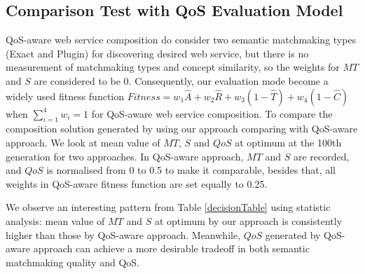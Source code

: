 \documentclass{IEEEtran}
\begin{document}
\subsection{Comparison Test with QoS Evaluation Model}\label{comparisonTest}
QoS-aware web service composition \cite{da2016particle,da2015graphevol,yu2013adaptive,ma2015hybrid} do consider two semantic matchmaking types (Exact and Plugin) for discovering desired web service, but there is no measurement of matchmaking types and concept similarity, so the weights for $MT$ and $S$ are considered to be 0. Consequently, our evaluation mode become a widely used fitness function $Fitness = w_1 \hat{A} + w_2 \hat{R} + w_3(1 - \hat{T}) + w_4(1 - \hat{C})$ when $\sum_{i=1}^{4} w_i = 1$ \cite{ma2015hybrid} for QoS-aware web service composition. To compare the composition solution generated by using our approach comparing with QoS-aware approach. We look at mean value of $MT$, $S$ and $QoS$ at optimum at the 100th generation for two approaches. In QoS-aware approach, $MT$ and $S$ are recorded, and $QoS$ is normalised from 0 to 0.5 to make it comparable, besides that, all weights in QoS-aware fitness function are set equally to 0.25.

We observe an interesting pattern from Table \ref{decisionTable} using statistic analysis: mean value of $MT$ and $S$ at optimum by our approach is consistently higher than those by QoS-aware approach.  Meanwhile, $QoS$ generated by QoS-aware approach can achieve a more desirable tradeoff in both semantic matchmaking quality and  QoS.  
\end{document}

